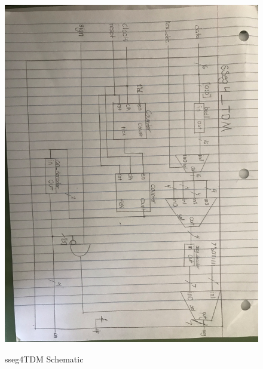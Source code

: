 \documentclass[11pt]{article}
\begin{document}
\begin{figure}[ht]\centering
	\caption{sseg4TDM Schematic}
	\includegraphics[width=1.05\textwidth]{sseg4_TDM_Schematic.jpeg}
	\label{fig:picture}
\end{figure}
\end{document}
